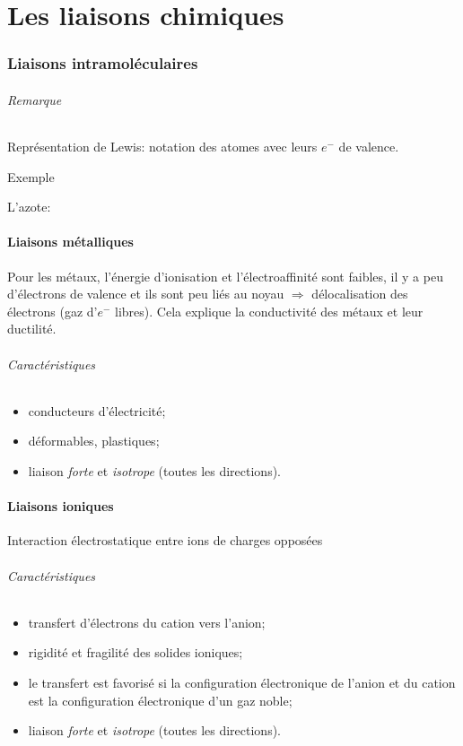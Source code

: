 \part{Les liaisons chimiques}
\section{Liaisons intramoléculaires}
\paragraph{Remarque} Représentation de Lewis: notation des atomes avec leurs $e^-$ de valence.

\subparagraph{Exemple} L'azote:\hspace{0.7cm} 

\subsection{Liaisons métalliques}
Pour les métaux, l'énergie d'ionisation et l'électroaffinité sont faibles, il y a peu d'électrons de valence et ils sont peu liés au noyau $\Rightarrow$ délocalisation des électrons (gaz d'$e^-$ libres).
Cela explique la conductivité des métaux et leur ductilité.
\paragraph{Caractéristiques}
\begin{itemize}
	\item conducteurs d'électricité;
	\item déformables, plastiques;
	\item liaison \emph{forte} et \emph{isotrope} (toutes les directions).
\end{itemize}

\subsection{Liaisons ioniques}
Interaction électrostatique entre ions de charges opposées
\paragraph{Caractéristiques}
\begin{itemize}
	\item transfert d'électrons du cation vers l'anion;
	\item rigidité et fragilité des solides ioniques;
	\item le transfert est favorisé si la configuration électronique de l'anion et du cation est la configuration électronique d'un gaz noble;
	\item liaison \emph{forte} et \emph{isotrope} (toutes les directions).
\end{itemize}

